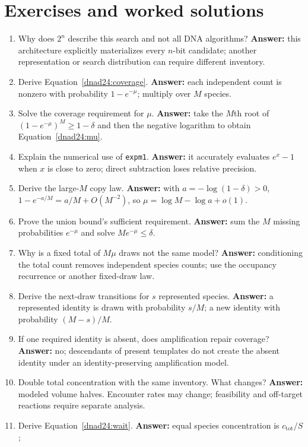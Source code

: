 \section{Exercises and worked solutions}
\begin{enumerate}
\item Why does $2^n$ describe this search and not all DNA algorithms?
\textbf{Answer:} this architecture explicitly materializes every $n$-bit candidate;
another representation or search distribution can require different inventory.
\item Derive Equation~\ref{dnad24:coverage}.
\textbf{Answer:} each independent count is nonzero with probability $1-e^{-\mu}$;
multiply over $M$ species.
\item Solve the coverage requirement for $\mu$.
\textbf{Answer:} take the $M$th root of $(1-e^{-\mu})^M\ge1-\delta$ and then
the negative logarithm to obtain Equation~\ref{dnad24:mu}.
\item Explain the numerical use of \texttt{expm1}.
\textbf{Answer:} it accurately evaluates $e^x-1$ when $x$ is close to zero;
direct subtraction loses relative precision.
\item Derive the large-$M$ copy law.
\textbf{Answer:} with $a=-\log(1-\delta)>0$,
$1-e^{-a/M}=a/M+O(M^{-2})$, so $\mu=\log M-\log a+o(1)$.
\item Prove the union bound's sufficient requirement.
\textbf{Answer:} sum the $M$ missing probabilities $e^{-\mu}$ and solve
$Me^{-\mu}\le\delta$.
\item Why is a fixed total of $M\mu$ draws not the same model?
\textbf{Answer:} conditioning the total count removes independent species counts;
use the occupancy recurrence or another fixed-draw law.
\item Derive the next-draw transitions for $s$ represented species.
\textbf{Answer:} a represented identity is drawn with probability $s/M$;
a new identity with probability $(M-s)/M$.
\item If one required identity is absent, does amplification repair coverage?
\textbf{Answer:} no; descendants of present templates do not create the absent
identity under an identity-preserving amplification model.
\item Double total concentration with the same inventory. What changes?
\textbf{Answer:} modeled volume halves. Encounter rates may change; feasibility
and off-target reactions require separate analysis.
\item Derive Equation~\ref{dnad24:wait}.
\textbf{Answer:} equal species concentration is $c_{\mathrm{tot}}/S$;

\end{enumerate}
